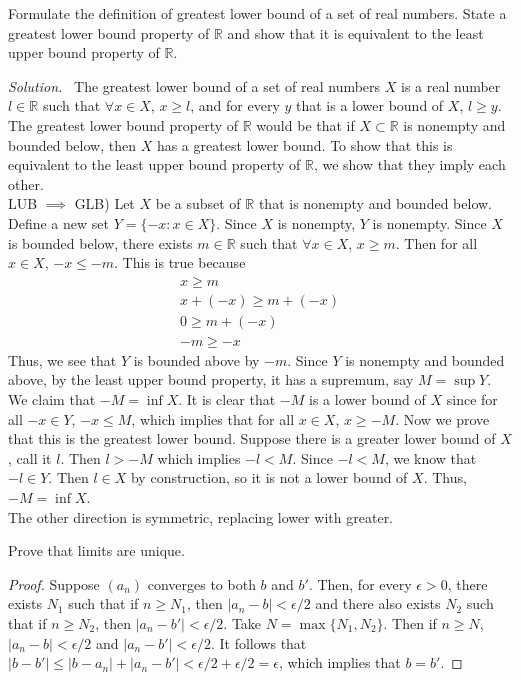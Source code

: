 \documentclass[12pt]{article}
\newcommand{\bbR}{\mathbb{R}}
\renewcommand{\_}[1]{\underline{ #1 }}
\theoremstyle{definition}
\newenvironment{exercise}[1]
  {\renewcommand\theinnercustomthm{#1}\innercustomthm}
  {\endinnercustomthm}
\newenvironment{solution}{\par\noindent\textit{Solution.}\ }{\par}
\numberwithin{equation}{subsection}
\begin{document}
\begin{exercise}{19}
    Formulate the definition of greatest lower bound of a set of real numbers. State a greatest lower bound property of $\bbR$ and show that it is equivalent to the least upper bound property of $\bbR$.
\end{exercise}
\begin{solution}
    The greatest lower bound of a set of real numbers $X$ is a real number $l \in \bbR$ such that $\forall x \in X$, $x \ge l$, and for every $y$ that is a lower bound of $X$, $l \ge y$. The greatest lower bound property of $\bbR$ would be that if $X \subset \bbR$ is nonempty and bounded below, then $X$ has a greatest lower bound. To show that this is equivalent to the least upper bound property of $\bbR$, we show that they imply each other. \\
    LUB $\implies$ GLB) Let $X$ be a subset of $\bbR$ that is nonempty and bounded below. Define a new set $Y = \{ -x : x \in X \}$. Since $X$ is nonempty, $Y$ is nonempty. Since $X$ is bounded below, there exists $m \in \bbR$ such that $\forall x \in X$, $x \ge m$. Then for all $x \in X$, $-x \le -m$. This is true because \begin{equation*}
        \begin{gathered}
            x \ge m \\
        x + (-x) \ge m + (-x) \\
        0 \ge m + (-x) \\
        -m \ge -x
        \end{gathered}
    \end{equation*} Thus, we see that $Y$ is bounded above by $-m$. Since $Y$ is nonempty and bounded above, by the least upper bound property, it has a supremum, say $M = \sup Y$. We claim that $-M = \inf X$. It is clear that $-M$ is a lower bound of $X$ since for all $-x \in Y$, $-x \le M$, which implies that for all $x \in X$, $x \ge -M$. Now we prove that this is the greatest lower bound. Suppose there is a greater lower bound of $X$, call it $l$. Then $l > -M$ which implies $-l < M$. Since $-l < M$, we know that $-l \in Y$. Then $l \in X$ by construction, so it is not a lower bound of $X$. Thus, $-M = \inf X$. \\
    The other direction is symmetric, replacing lower with greater.
    
\end{solution}

\begin{exercise}{20}
    Prove that limits are unique. 
\end{exercise}
\begin{proof}
    Suppose $(a_n)$ converges to both $b$ and $b'$. Then, for every $\epsilon > 0$, there exists $N_1$ such that if $n \ge N_1$, then $|a_n - b| < \epsilon/2$ and there also exists $N_2$ such that if $n \ge N_2$, then $|a_n - b'| < \epsilon/2$. Take $N = \max\{N_1, N_2 \}$. Then if $n \ge N$, $|a_n - b| < \epsilon/2$ and $|a_n - b'| < \epsilon/2$. It follows that $|b - b'| \le |b - a_n| + |a_n - b'| < \epsilon/2 + \epsilon/2 = \epsilon$, which implies that $b = b'$. 
\end{proof}
\end{document}
